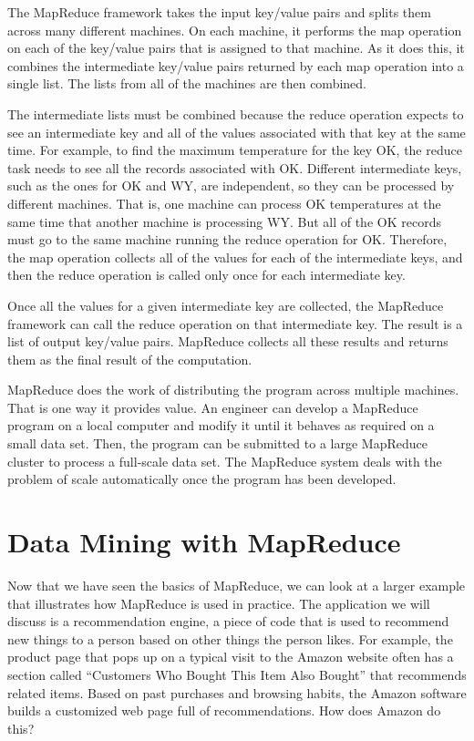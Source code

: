 The MapReduce framework
takes the input key/value pairs and splits them across many
different machines.  On each machine, it performs the map
operation on each of the key/value pairs that is assigned to
that machine.  As it does this, it combines the intermediate
key/value pairs returned by each map operation into a single
list.  The lists from all of the machines are then combined.

The intermediate lists must be combined because
the reduce operation expects to see an intermediate key and all
of the values associated with that key at the same time. For example,
to find the maximum temperature for the key \textsf{OK}, the reduce
task needs to see all the records associated with \textsf{OK}.
Different intermediate keys, such as the ones for \textsf{OK} and \textsf{WY},
are independent, so they can be processed by different machines.
That is, one machine can process \textsf{OK} temperatures at the same
time that another machine is processing \textsf{WY}.
But all of the \textsf{OK} records must go to the same machine running
the reduce operation for \textsf{OK}.
Therefore, the map operation collects all of the values for
each of the intermediate keys, and then the reduce operation is
called only once for each intermediate key.

Once all the values for a given intermediate key are
collected, the MapReduce framework can call the reduce
operation on that intermediate key.  The result is a list of
output key/value pairs. MapReduce collects all these
results and returns them as the final result of the computation.

MapReduce does the work of distributing
the program across multiple machines.
That is one way it provides value.
An engineer can develop a MapReduce program on
a local computer and modify it until it behaves as
required on a small data set.
Then, the program can be submitted to a large MapReduce cluster
to process a full-scale data set.
The MapReduce system deals with the problem of scale
automatically once the program has been developed.

\section{Data Mining with MapReduce}

Now
that we have seen the basics of MapReduce, we can look at
a larger example that illustrates how MapReduce is
used in practice.  The application we will discuss is a recommendation engine,
a piece of code that is used to recommend new things to a person
based on other things the person likes.
For example, the product page that pops up on a typical visit to
the Amazon website often has a section called ``Customers Who Bought
This Item Also Bought'' that recommends related items.
Based on past purchases and browsing habits, the Amazon software
builds a customized web page full of recommendations.
How does Amazon do this?

